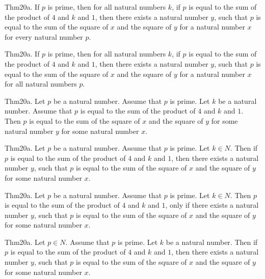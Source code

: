 \documentclass{article}
\begin{document}
Thm20a. If $p$ is prime, then for all natural numbers $k$, if $p$ is equal to the sum of the product of $4$ and $k$ and $1$, then there exists a natural number $y$, such that $p$ is equal to the sum of the square of $x$ and the square of $y$ for a natural number $x$ for every natural number $p$.

Thm20a. If $p$ is prime, then for all natural numbers $k$, if $p$ is equal to the sum of the product of $4$ and $k$ and $1$, then there exists a natural number $y$, such that $p$ is equal to the sum of the square of $x$ and the square of $y$ for a natural number $x$ for all natural numbers $p$.

Thm20a. Let $p$ be a natural number. Assume that $p$ is prime. Let $k$ be a natural number. Assume that $p$ is equal to the sum of the product of $4$ and $k$ and $1$. Then $p$ is equal to the sum of the square of $x$ and the square of $y$ for some natural number $y$ for some natural number $x$.

Thm20a. Let $p$ be a natural number. Assume that $p$ is prime. Let $k \in N$. Then if $p$ is equal to the sum of the product of $4$ and $k$ and $1$, then there exists a natural number $y$, such that $p$ is equal to the sum of the square of $x$ and the square of $y$ for some natural number $x$.

Thm20a. Let $p$ be a natural number. Assume that $p$ is prime. Let $k \in N$. Then $p$ is equal to the sum of the product of $4$ and $k$ and $1$, only if there exists a natural number $y$, such that $p$ is equal to the sum of the square of $x$ and the square of $y$ for some natural number $x$.

Thm20a. Let $p \in N$. Assume that $p$ is prime. Let $k$ be a natural number. Then if $p$ is equal to the sum of the product of $4$ and $k$ and $1$, then there exists a natural number $y$, such that $p$ is equal to the sum of the square of $x$ and the square of $y$ for some natural number $x$.
\end{document}
